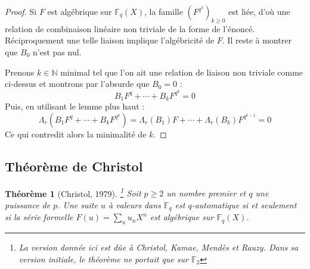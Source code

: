 \documentclass[12pt]{article}
\theoremstyle{plain}
\newtheorem{theoreme}{Th\'eor\`eme}
\theoremstyle{definition}
\theoremstyle{remark}
\begin{document}
\begin{proof}
  Si $F$ est alg\'ebrique sur $\mathbb{F}_{q}(X)$, la famille $(F^{q^{k}})_{k\ge0}$ est li\'ee, d'o\`u une
  relation de combinaison lin\'eaire non triviale de la forme de l'\'enonc\'e. R\'eciproquement une telle 
  liaison implique l'alg\'ebricit\'e de $F$. Il reste \`a montrer que $B_{0}$ n'est pas nul.

  Prenons $k\in\mathbb{N}$ minimal tel que l'on ait une relation de liaison non triviale comme ci-dessus et 
  montrons  par l'absurde que $B_{0}=0$ : $$B_{1}F^{q}+\cdots+B_{k}F^{q^{k}}=0$$
  Puis, en utilisant le lemme plus haut : $$\Lambda_{r}(B_{1}F^{q}+\cdots+B_{k}F^{q^{k}})=\Lambda_{r}(B_{1}
  )F+\cdots+\Lambda_{r}(B_{k})F^{q^{k-1}}=0$$
  Ce qui contredit alors la minimalit\'e de $k$.
\end{proof}

\subsection{Th\'eor\`eme de Christol}

\begin{theoreme}[Christol, 1979]\footnote{La version donn\'ee ici est d\^ue \`a Christol, Kamae, Mend\`es et Rauzy. Dans sa version initiale, le th\'eor\`eme ne portait que sur $\mathbb{F}_{2}$}
  Soit $p\ge2$ un nombre premier et $q$ une puissance de $p$. Une suite $u$ \`a valeurs dans $\mathbb{F}_
  {q}$ est $q$-automatique si et seulement si la s\'erie formelle $F(u)=\sum_{n}u_{n}X^{n}$ est
  alg\'ebrique sur $\mathbb{F}_{q}(X)$.
\end{theoreme}
\end{document}
